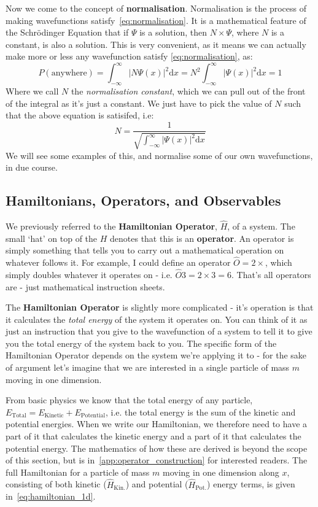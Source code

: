 \documentclass{memoir}[11pt,oneside,a4paper,openany]
\newcommand{\wf}{\ensuremath{\Psi}\xspace}
\begin{document}
Now we come to the concept of \textbf{normalisation}. Normalisation is the process of making wavefunctions satisfy~\autoref{eq:normalisation}. It is a mathematical feature of the Schr{\"o}dinger Equation that if \wf is a solution, then $N \times \wf$, where $N$ is a constant, is also a solution. This is very convenient, as it means we can actually make more or less any wavefunction satisfy \autoref{eq:normalisation}, as:
\begin{equation}
	P(\text{anywhere}) = \int_{-\infty}^{\infty} \lvert N\wf(x) \rvert ^2 \mathrm{d}x = N^2 \int_{-\infty}^{\infty} \lvert \wf(x) \rvert ^2 \mathrm{d}x = 1
\end{equation}
Where we call $N$ the \emph{normalisation constant}, which we can pull out of the front of the integral as it's just a constant. We just have to pick the value of $N$ such that the above equation is satisifed, i.e:
\begin{equation}
	N = \frac{1}{\sqrt{\int_{-\infty}^{\infty} \lvert \wf(x) \rvert ^2 \mathrm{d}x}}
\end{equation}
We will see some examples of this, and normalise some of our own wavefunctions, in due course.

\subsection{Hamiltonians, Operators, and Observables}
We previously referred to the \textbf{Hamiltonian Operator}, $\hat{H}$, of a system. The small `hat' on top of the $H$ denotes that this is an \textbf{operator}. An operator is simply something that tells you to carry out a mathematical operation on whatever follows it. For example, I could define an operator $\hat{O} = 2\times$, which simply doubles whatever it operates on - i.e. $\hat{O}3 = 2\times 3 = 6$. That's all operators are - just mathematical instruction sheets. 

The \textbf{Hamiltonian Operator} is slightly more complicated - it's operation is that it calculates the \emph{total energy} of the system it operates on. You can think of it as just an instruction that you give to the wavefunction of a system to tell it to give you the total energy of the system back to you. The specific form of the Hamiltonian Operator depends on the system we're applying it to - for the sake of argument let's imagine that we are interested in a single particle of mass $m$ moving in one dimension. 

From basic physics we know that the total energy of any particle, $E_{\text{Total}} = E_{\text{Kinetic}} + E_{\text{Potential}}$, i.e. the total energy is the sum of the kinetic and potential energies. When we write our Hamiltonian, we therefore need to have a part of it that calculates the kinetic energy and a part of it that calculates the potential energy. The mathematics of how these are derived is beyond the scope of this section, but is in~\autoref{app:operator_construction} for interested readers. The full Hamiltonian for a particle of mass $m$ moving in one dimension along $x$, consisting of both kinetic ($\hat{H}_{\text{Kin.}}$) and potential ($\hat{H}_{\text{Pot.}}$) energy terms, is given in~\autoref{eq:hamiltonian_1d}. 
\end{document}
